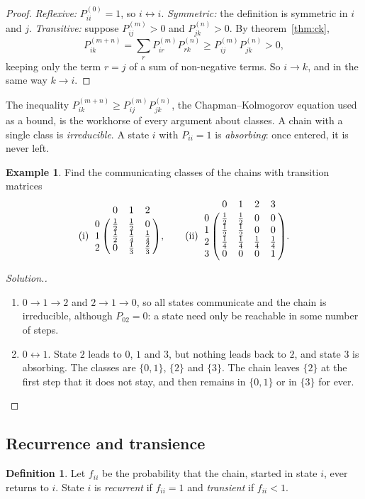 \documentclass[12pt,a4paper]{report}
\theoremstyle{definition}
\newtheorem{defn}[thm]{Definition}
\newtheorem{exa}[thm]{Example}
\newenvironment{solution}
  {\renewcommand{\qedsymbol}{}\begin{proof}[\textit{Solution}.]}
  {\end{proof}}
\begin{document}
\begin{proof}
\emph{Reflexive:} $P_{ii}^{(0)} = 1$, so $i\leftrightarrow i$. \emph{Symmetric:} the definition is
symmetric in $i$ and $j$. \emph{Transitive:} suppose $P_{ij}^{(m)}>0$ and $P_{jk}^{(n)}>0$. By
theorem~\ref{thm:ck},
\[P_{ik}^{(m + n)} = \sum_rP_{ir}^{(m)}P_{rk}^{(n)}\geq P_{ij}^{(m)}P_{jk}^{(n)}>0,\]
keeping only the term $r = j$ of a sum of non-negative terms. So $i\to k$, and in the same way
$k\to i$.
\end{proof}

The inequality $P_{ik}^{(m + n)}\geq P_{ij}^{(m)}P_{jk}^{(n)}$, the Chapman--Kolmogorov equation
used as a bound, is the workhorse of every argument about classes. A chain with a single
class is \emph{irreducible}. A state $i$ with $P_{ii} = 1$ is \emph{absorbing}: once entered, it
is never left.

\begin{exa}
\label{ex:classes}
Find the communicating classes of the chains with transition matrices
\[\text{(i)}\ \bordermatrix{~ & 0 & 1 & 2\cr 0 & \frac12 & \frac12 & 0\cr 1 & \frac12 & \frac14 & \frac14\cr 2 & 0 & \frac13 & \frac23\cr},
\qquad
\text{(ii)}\ \bordermatrix{~ & 0 & 1 & 2 & 3\cr 0 & \frac12 & \frac12 & 0 & 0\cr 1 & \frac12 & \frac12 & 0 & 0\cr 2 & \frac14 & \frac14 & \frac14 & \frac14\cr 3 & 0 & 0 & 0 & 1\cr} .\]
\end{exa}

\begin{solution}
\begin{enumerate}
\item[(i)] $0\to 1\to 2$ and $2\to 1\to 0$, so all states communicate and the chain is
irreducible, although $P_{02} = 0$: a state need only be reachable in some number of steps.
\item[(ii)] $0\leftrightarrow 1$. State $2$ leads to $0$, $1$ and $3$, but nothing leads back to $2$,
and state $3$ is absorbing. The classes are $\{0, 1\}$, $\{2\}$ and $\{3\}$. The chain leaves
$\{2\}$ at the first step that it does not stay, and then remains in $\{0, 1\}$ or in $\{3\}$ for
ever.
\end{enumerate}
\end{solution}

\subsection{Recurrence and transience}

\begin{defn}
\label{def:recurrent}
Let $f_{ii}$ be the probability that the chain, started in state $i$, ever returns to $i$.
State $i$ is \emph{recurrent} if $f_{ii} = 1$ and \emph{transient} if $f_{ii}<1$.
\end{defn}
\end{document}

